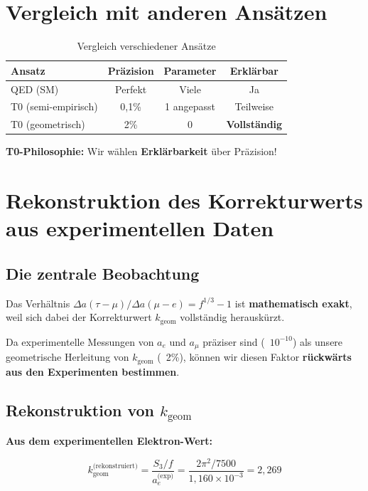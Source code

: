 	\section{Vergleich mit anderen Ansätzen}
	
	\begin{table}[h]
		\centering
		\begin{tabular}{lccc}
			\toprule
			\textbf{Ansatz} & \textbf{Präzision} & \textbf{Parameter} & \textbf{Erklärbar} \\
			\midrule
			QED (SM) & Perfekt & Viele & Ja \\
			T0 (semi-empirisch) & 0{,}1\% & 1 angepasst & Teilweise \\
			T0 (geometrisch) & 2\% & 0 & \textbf{Vollständig} \\
			\bottomrule
		\end{tabular}
		\caption{Vergleich verschiedener Ansätze}
	\end{table}
	
	\textbf{T0-Philosophie:} Wir wählen \textbf{Erklärbarkeit} über Präzision!
	\section{Rekonstruktion des Korrekturwerts aus experimentellen Daten}
	
	\subsection{Die zentrale Beobachtung}
	
	Das Verhältnis $\Delta a(\tau-\mu) / \Delta a(\mu-e) = f^{1/3} - 1$ ist \textbf{mathematisch exakt}, weil sich dabei der Korrekturwert $k_{\text{geom}}$ vollständig herauskürzt.
	
	Da experimentelle Messungen von $a_e$ und $a_\mu$ präziser sind (~$10^{-10}$) als unsere geometrische Herleitung von $k_{\text{geom}}$ (~2\%), können wir diesen Faktor \textbf{rückwärts aus den Experimenten bestimmen}.
	
	\subsection{Rekonstruktion von $k_{\text{geom}}$}
	
	\textbf{Aus dem experimentellen Elektron-Wert:}
	
	\begin{equation}
		k_{\text{geom}}^{\text{(rekonstruiert)}} = \frac{S_3/f}{a_e^{\text{(exp)}}} = \frac{2\pi^2 / 7500}{1{,}160 \times 10^{-3}} = 2{,}269
	\end{equation}
	
